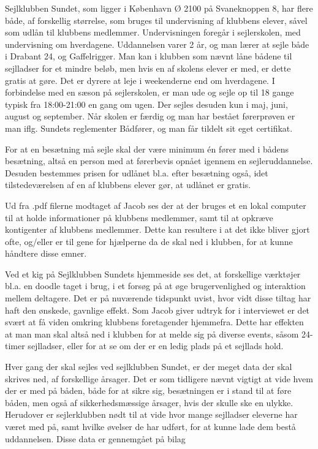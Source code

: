 Sejlklubben Sundet, som ligger i København Ø 2100 på Svaneknoppen 8, har flere både, af forskellig størrelse, som bruges
til undervisning af klubbens elever, såvel som udlån til klubbens medlemmer. Undervisningen foregår i sejlerskolen, med
undervisning om hverdagene. Uddannelsen varer 2 år, og man lærer at sejle både i Drabant 24, og Gaffelrigger. Man kan i
klubben som nævnt låne bådene til sejlladser for et mindre beløb, men hvis en af skolens elever er med, er dette gratis
at gøre. Det er dyrere at leje i weekenderne end om hverdagene. I forbindelse med en sæson på sejlerskolen, er man ude
og sejle op til 18 gange typisk fra 18:00-21:00 en gang om ugen. Der sejles desuden kun i maj, juni, august og
september. Når skolen er færdig og man har bestået førerprøven er man iflg. Sundets reglementer Bådfører, og man får
tildelt sit eget certifikat.

For at en besætning må sejle skal der være minimum én fører med i bådens besætning, altså en person med at førerbevis
opnået igennem en sejleruddannelse. Desuden bestemmes prisen for udlånet bl.a. efter besætning også, idet
tilstedeværelsen af en af klubbens elever gør, at udlånet er gratis.\citep{Sundet}

Ud fra .pdf filerne modtaget af Jacob ses der at der bruges et en lokal computer til at holde informationer på klubbens medlemmer, samt til at opkræve kontigenter af klubbens medlemmer. Dette kan resultere i at det ikke bliver gjort ofte, og/eller er til gene for hjælperne da de skal ned i klubben, for at kunne håndtere disse emner.

Ved et kig på Sejlklubben Sundets hjemmeside \citep{SundetUdlaan} ses det, at forskellige værktøjer bl.a. en doodle
taget i brug, i et forsøg på at øge brugervenlighed og interaktion mellem deltagere. Det er på nuværende tidspunkt
uvist, hvor vidt disse tiltag har haft den ønskede, gavnlige effekt. Som Jacob giver udtryk for i interviewet er det svært at få viden omkring klubbens foretagender hjemmefra. Dette har effekten at man man skal altså ned i klubben for at melde sig på diverse events, såsom 24-timer sejlladser, eller for at se om der er en ledig plads på et sejllads hold.

Hver gang der skal sejles ved sejlklubben Sundet, er der meget data der skal skrives ned, af forskellige årsager. Det er som tidligere nævnt vigtigt at vide hvem der er med på båden, både for at sikre sig, besætningen er i stand til at føre båden, men også af sikkerhedsmæssige årsager, hvis der skulle ske en ulykke. Herudover er sejlerklubben nødt til at vide hvor mange sejlladser eleverne har været med på, samt hvilke øvelser de har udført, for at kunne lade dem bestå uddannelsen. Disse data er gennemgået på bilag

